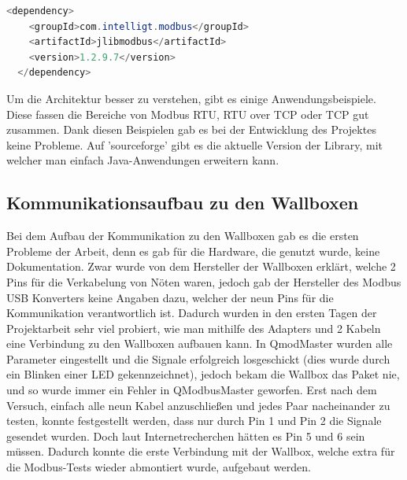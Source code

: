  \begin{lstlisting}[language=java,caption=Dependency in Pom.xml,label=lst:impl:foo]
    <dependency> 
    <groupId>com.intelligt.modbus</groupId> 
    <artifactId>jlibmodbus</artifactId> 
    <version>1.2.9.7</version> 
  </dependency> 
\end{lstlisting}


Um die Architektur besser zu verstehen, gibt es einige Anwendungsbeispiele. Diese fassen die Bereiche von Modbus RTU, RTU over TCP oder TCP gut zusammen. Dank diesen Beispielen gab es bei der Entwicklung des Projektes keine Probleme. Auf 'sourceforge' gibt es die aktuelle Version der Library, mit welcher man einfach Java-Anwendungen erweitern kann.

\subsection{Kommunikationsaufbau zu den Wallboxen }

Bei dem Aufbau der Kommunikation zu den Wallboxen gab es die ersten Probleme der Arbeit, denn es gab für die Hardware, die genutzt wurde, keine Dokumentation. Zwar wurde von dem Hersteller der Wallboxen erklärt, welche 2 Pins für die Verkabelung von Nöten waren, jedoch gab der Hersteller des Modbus USB Konverters keine Angaben dazu, welcher der neun Pins für die Kommunikation verantwortlich ist. Dadurch wurden in den ersten Tagen der Projektarbeit sehr viel probiert, wie man mithilfe des Adapters und 2 Kabeln eine Verbindung zu den Wallboxen aufbauen kann. In QmodMaster wurden alle Parameter eingestellt und die Signale erfolgreich losgeschickt (dies wurde durch ein Blinken einer LED gekennzeichnet), jedoch bekam die Wallbox  das Paket nie, und so wurde immer ein Fehler in QModbusMaster geworfen. Erst nach dem Versuch, einfach alle neun Kabel anzuschließen und jedes Paar nacheinander zu testen, konnte festgestellt werden, dass nur durch Pin 1 und Pin 2 die Signale gesendet wurden. Doch laut Internetrecherchen hätten es Pin 5 und 6 sein müssen. Dadurch konnte die erste Verbindung mit der Wallbox, welche extra für die Modbus-Tests wieder abmontiert wurde, aufgebaut werden.   

 

